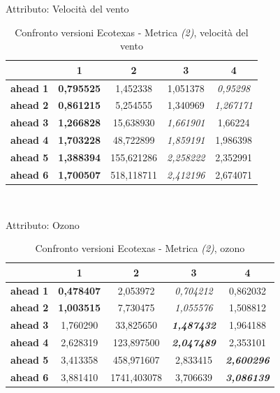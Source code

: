 \documentclass[12pt,a4paper,oneside,openright]{book}
\begin{document}
\medskip

Attributo: Velocità del vento \\ 

\begin{table}[H]
\centering
\begin{tabular}{|c|c|c|c|c|}
\hline
& 1 & 2 & 3 & 4 \\
\hline
\textbf{ahead 1} & \textbf{0,795525} & 1,452338 & 1,051378 & \textit{0,95298}\\
\hline
\textbf{ahead 2} & \textbf{0,861215} & 5,254555 & 1,340969 & \textit{1,267171}\\ 
\hline
\textbf{ahead 3} & \textbf{1,266828} & 15,638930 & \textit{1,661901} & 1,66224\\
\hline
\textbf{ahead 4} & \textbf{1,703228} & 48,722899 & \textit{1,859191} & 1,986398\\ 
\hline
\textbf{ahead 5} & \textbf{1,388394} & 155,621286 & \textit{2,258222} & 2,352991\\
\hline
\textbf{ahead 6} & \textbf{1,700507} & 518,118711 & \textit{2,412196} & 2,674071\\ 
\hline
\end{tabular} \\
\caption{Confronto versioni Ecotexas - Metrica \textit{(2)}, velocità del vento}
\end{table} 

\medskip

Attributo: Ozono \\ 

\begin{table}[H]
\centering
\begin{tabular}{|c|c|c|c|c|}
\hline
& 1 & 2 & 3 & 4 \\
\hline
\textbf{ahead 1} & \textbf{0,478407} & 2,053972 & \textit{0,704212} & 0,862032\\
\hline
\textbf{ahead 2} & \textbf{1,003515} & 7,730475 & \textit{1,055576} & 1,508812\\ 
\hline
\textbf{ahead 3} & 1,760290 & 33,825650 & \textit{\textbf{1,487432}} & 1,964188\\
\hline
\textbf{ahead 4} & 2,628319 & 123,897500 & \textit{\textbf{2,047489}} & 2,353101\\ 
\hline
\textbf{ahead 5} & 3,413358 & 458,971607 & 2,833415 & \textit{\textbf{2,600296}}\\
\hline
\textbf{ahead 6} & 3,881410 & 1741,403078 & 3,706639 & \textit{\textbf{3,086139}}\\ 
\hline
\end{tabular} \\
\caption{Confronto versioni Ecotexas - Metrica \textit{(2)}, ozono}
\end{table} 
\end{document}
